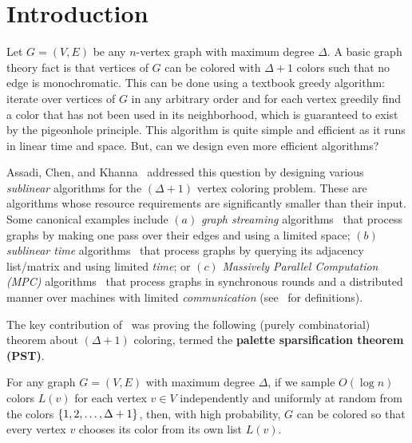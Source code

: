 
\section{Introduction}\label{sec:intro}

Let $G=(V,E)$ be any $n$-vertex graph with maximum degree $\Delta$. A basic graph theory fact is that vertices of $G$ can be colored with $\Delta+1$ colors such that no edge is monochromatic. This can be done using 
a textbook greedy algorithm: iterate over vertices of $G$ in any arbitrary order and for each vertex greedily find a color that has not been used in its neighborhood, which is guaranteed to exist by the pigeonhole principle. 
This algorithm is quite simple and efficient as it runs in linear time and space. But, can we design even more efficient algorithms? 

Assadi, Chen, and Khanna~\cite{AssadiCK19} addressed this question by designing various \emph{sublinear} algorithms for the $(\Delta+1)$ vertex coloring problem. These are algorithms whose resource requirements 
are significantly smaller than their input. Some canonical examples include $(a)$ \emph{graph streaming} algorithms~\cite{FeigenbaumKMSZ04} that process graphs by making one pass 
over their edges and using a limited space; $(b)$ \emph{sublinear time} algorithms~\cite{ChazelleRT01} that process graphs by 
querying its adjacency list/matrix and using limited \emph{time}; or $(c)$ \emph{Massively Parallel Computation (MPC)} algorithms~\cite{KarloffSV10} that process graphs 
in synchronous rounds and a distributed manner over machines with limited \emph{communication} (see~ for definitions). 

The key contribution of~\cite{AssadiCK19} was proving the following (purely combinatorial) theorem about $(\Delta+1)$ coloring, termed the \textbf{palette sparsification theorem (PST)}. 

\begin{theorem}\label{thm:pst}
	For any graph $G=(V,E)$ with maximum degree $\Delta$, if we sample $O(\log{n})$ colors $L(v)$ for each vertex $v \in V$ independently and uniformly at random
	from the  colors $\left\{ 1,2,\ldots,\Delta+1 \right\}$, then, with high probability, $G$ can be colored so that every vertex $v$ chooses its color from its own list $L(v)$. 
\end{theorem}

